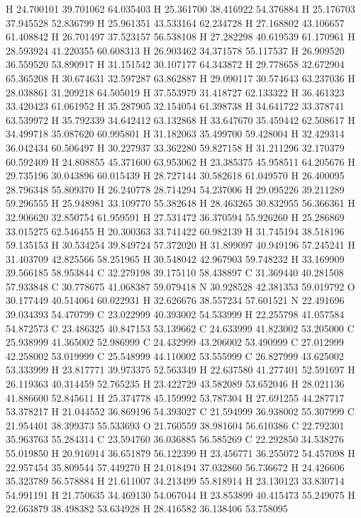\documentclass{article}
\begin{document}
H 24.700101 39.701062 64.035403
H 25.361700 38.416922 54.376884
H 25.176703 37.945528 52.836799
H 25.961351 43.533164 62.234728
H 27.168802 43.106657 61.408842
H 26.701497 37.523157 56.538108
H 27.282298 40.619539 61.170961
H 28.593924 41.220355 60.608313
H 26.903462 34.371578 55.117537
H 26.909520 36.559520 53.890917
H 31.151542 30.107177 64.343872
H 29.778658 32.672904 65.365208
H 30.674631 32.597287 63.862887
H 29.090117 30.574643 63.237036
H 28.038861 31.209218 64.505019
H 37.553979 31.418727 62.133322
H 36.461323 33.420423 61.061952
H 35.287905 32.154054 61.398738
H 34.641722 33.378741 63.539972
H 35.792339 34.642412 63.132868
H 33.647670 35.459442 62.508617
H 34.499718 35.087620 60.995801
H 31.182063 35.499700 59.428004
H 32.429314 36.042434 60.506497
H 30.227937 33.362280 59.827158
H 31.211296 32.170379 60.592409
H 24.808855 45.371600 63.953062
H 23.385375 45.958511 64.205676
H 29.735196 30.043896 60.015439
H 28.727144 30.582618 61.049570
H 26.400095 28.796348 55.809370
H 26.240778 28.714294 54.237006
H 29.095226 39.211289 59.296555
H 25.948981 33.109770 55.382648
H 28.463265 30.832955 56.366361
H 32.906620 32.850754 61.959591
H 27.531472 36.370594 55.926260
H 25.286869 33.015275 62.546455
H 20.300363 33.741422 60.982139
H 31.745194 38.518196 59.135153
H 30.534254 39.849724 57.372020
H 31.899097 40.949196 57.245241
H 31.403709 42.825566 58.251965
H 30.548042 42.967903 59.748232
H 33.169909 39.566185 58.953844
C 32.279198 39.175110 58.438897
C 31.369440 40.281508 57.933848
C 30.778675 41.068387 59.079418
N 30.928528 42.381353 59.019792
O 30.177449 40.514064 60.022931
H 32.626676 38.557234 57.601521
N 22.491696 39.034393 54.470799
C 23.022999 40.393002 54.533999
H 22.255798 41.057584 54.872573
C 23.486325 40.847153 53.139662
C 24.633999 41.823002 53.205000
C 25.938999 41.365002 52.986999
C 24.432999 43.206002 53.490999
C 27.012999 42.258002 53.019999
C 25.548999 44.110002 53.555999
C 26.827999 43.625002 53.333999
H 23.817771 39.973375 52.563349
H 22.637580 41.277401 52.591697
H 26.119363 40.314459 52.765235
H 23.422729 43.582089 53.652046
H 28.021136 41.886600 52.845611
H 25.374778 45.159992 53.787304
H 27.691255 44.287717 53.378217
H 21.044552 36.869196 54.393027
C 21.594999 36.938002 55.307999
C 21.954401 38.399373 55.533693
O 21.760559 38.981604 56.610386
C 22.792301 35.963763 55.284314
C 23.594760 36.036885 56.585269
C 22.292850 34.538276 55.019850
H 20.916914 36.651879 56.122399
H 23.456771 36.255072 54.457098
H 22.957454 35.809544 57.449270
H 24.018494 37.032860 56.736672
H 24.426606 35.323789 56.578884
H 21.611007 34.213499 55.818914
H 23.130123 33.830714 54.991191
H 21.750635 34.469130 54.067044
H 23.853899 40.415473 55.249075
H 22.663879 38.498382 53.634928
H 28.416582 36.138406 53.758095
~    
   
\end{document}
